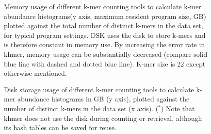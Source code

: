\documentclass{article}
\begin{document}
\begin{figure}
\caption{Memory usage of different k-mer counting tools to calculate k-mer abundance histograms(y axis, maximum resident program size, GB) plotted against the total number of distinct k-mers in the data set, for typical program settings. DSK uses the disk to store k-mers and is therefore constant in memory use. By increasing the error rate in khmer, memory usage can be substantially decreased (compare solid blue line with dashed and dotted blue line). K-mer size is 22 except otherwise mentioned.}
\label{cmp_memory}
\end{figure}

\begin{figure}
\caption{Disk storage usage of different k-mer counting tools to calculate k-mer abundance histograms in GB (y axis),
plotted against the number of distinct k-mers in the data set (x axis).  ($^*$) Note that khmer does not use the disk during counting or retrieval, although its hash tables can be saved for reuse.}
\label{cmp_disk}
\end{figure}
\end{document}
